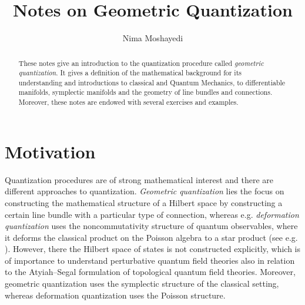 \documentclass[12pt]{amsart}
\numberwithin{equation}{section}
\theoremstyle{plain}
\theoremstyle{definition}
\theoremstyle{remark}
\begin{document}
\title[Notes on Geometric Quantization]{
Notes on Geometric Quantization}
\author[N. Moshayedi]{Nima Moshayedi}
\address{Institut f\"ur Mathematik\\ Universit\"at Z\"urich\\ 
Winterthurerstrasse 190
CH-8057 Z\"urich}

\maketitle

%
%

\begin{abstract}
These notes give an introduction to the quantization procedure called \emph{geometric quantization}. It gives a definition of the mathematical background for its understanding and introductions to classical and Quantum Mechanics, to differentiable manifolds, symplectic manifolds and the geometry of line bundles and connections. Moreover, these notes are endowed with several exercises and examples.
\end{abstract}

\newpage

\tableofcontents

\newpage

\section{Motivation}
Quantization procedures are of strong mathematical interest and there are different approaches to quantization. \emph{Geometric quantization} \cite{GuilleminSternberg1982,Kir85,Wood97,BatesWeinstein2012} lies the focus on constructing the mathematical structure of a Hilbert space by constructing a certain line bundle with a particular type of connection, whereas e.g. \emph{deformation quantization} \cite{Weyl1931,Moy,DeWildeLecomte1983,Fedosov1994,K,CalaquePantevToenVaquieVezzosi2017} uses the noncommutativity structure of quantum observables, where it deforms the classical product on the Poisson algebra to a star product (see e.g. \cite{GuttRawnsleySternheimer2005}). However, there the Hilbert space of states is not constructed explicitly, which is of importance to understand perturbative quantum field theories also in relation to the Atyiah--Segal formulation \cite{Atiyah1988,Segal1988} of topological quantum field theories. 
Moreover, geometric quantization uses the symplectic structure of the classical setting, whereas deformation quantization uses the Poisson structure. 
\end{document}
